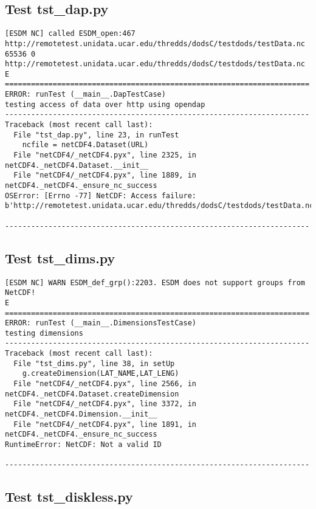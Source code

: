 \subsection{Test tst\_dap.py}

\begin{verbatim}
[ESDM NC] called ESDM_open:467 http://remotetest.unidata.ucar.edu/thredds/dodsC/testdods/testData.nc 65536 0 http://remotetest.unidata.ucar.edu/thredds/dodsC/testdods/testData.nc
E
======================================================================
ERROR: runTest (__main__.DapTestCase)
testing access of data over http using opendap
----------------------------------------------------------------------
Traceback (most recent call last):
  File "tst_dap.py", line 23, in runTest
    ncfile = netCDF4.Dataset(URL)
  File "netCDF4/_netCDF4.pyx", line 2325, in netCDF4._netCDF4.Dataset.__init__
  File "netCDF4/_netCDF4.pyx", line 1889, in netCDF4._netCDF4._ensure_nc_success
OSError: [Errno -77] NetCDF: Access failure: b'http://remotetest.unidata.ucar.edu/thredds/dodsC/testdods/testData.nc'

----------------------------------------------------------------------
\end{verbatim}

\subsection{Test tst\_dims.py}

\begin{verbatim}
[ESDM NC] WARN ESDM_def_grp():2203. ESDM does not support groups from NetCDF!
E
======================================================================
ERROR: runTest (__main__.DimensionsTestCase)
testing dimensions
----------------------------------------------------------------------
Traceback (most recent call last):
  File "tst_dims.py", line 38, in setUp
    g.createDimension(LAT_NAME,LAT_LENG)
  File "netCDF4/_netCDF4.pyx", line 2566, in netCDF4._netCDF4.Dataset.createDimension
  File "netCDF4/_netCDF4.pyx", line 3372, in netCDF4._netCDF4.Dimension.__init__
  File "netCDF4/_netCDF4.pyx", line 1891, in netCDF4._netCDF4._ensure_nc_success
RuntimeError: NetCDF: Not a valid ID

----------------------------------------------------------------------
\end{verbatim}

\subsection{Test tst\_diskless.py}


